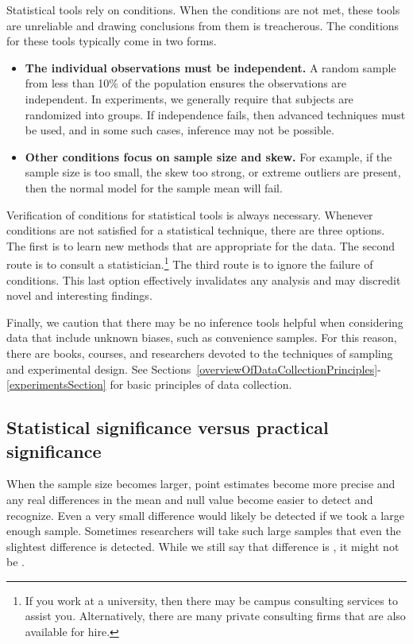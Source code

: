 Statistical tools rely on conditions. When the conditions are not met, these tools are unreliable and drawing conclusions from them is treacherous. The conditions for these tools typically come in two forms.
\begin{itemize}
\setlength{\itemsep}{0mm}
\item \textbf{The individual observations must be independent.} A random sample from less than 10\% of the population ensures the observations are independent. In experiments, we generally require that subjects are randomized into groups. If independence fails, then advanced techniques must be used, and in some such cases, inference may not be possible.
\item \textbf{Other conditions focus on sample size and skew.} For example, if the sample size is too small, the skew too strong, or extreme outliers are present, then the normal model for the sample mean will fail.
\end{itemize}
Verification of conditions for statistical tools is always necessary. Whenever conditions are not satisfied for a statistical technique, there are three options. The first is to learn new methods that are appropriate for the data. The second route is to consult a statistician.\footnote{If you work at a university, then there may be campus consulting services to assist you. Alternatively, there are many private consulting firms that are also available for hire.} The third route is to ignore the failure of conditions. This last option effectively invalidates any analysis and may discredit novel and interesting findings.

Finally, we caution that there may be no inference tools helpful when considering data that include unknown biases, such as convenience samples. For this reason, there are books, courses, and researchers devoted to the techniques of sampling and experimental design. See Sections~\ref{overviewOfDataCollectionPrinciples}-\ref{experimentsSection} for basic principles of data collection.





\subsection{Statistical significance versus practical significance}

When the sample size becomes larger, point estimates become more precise and any real differences in the mean and null value become easier to detect and recognize. Even a very small difference would likely be detected if we took a large enough sample. Sometimes researchers will take such large samples that even the slightest difference is detected. While we still say that difference is , it might not be .

